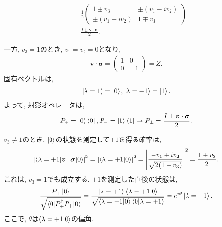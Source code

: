 \begin{ex}
\begin{align*}
         & =
        \frac{1}{2}
        \begin{pmatrix}
            1\pm v_3         & \pm(v_1 - i v_2) \\
            \pm(v_1 - i v_2) & 1\mp v_3
        \end{pmatrix}                    \\
         & =
        \frac{I \pm \bm{v} \cdot \bm{\sigma}}{2}.
    \end{align*}
    \par
    一方, $v_3 = 1$のとき, $v_1 = v_2 = 0$となり,
    \begin{align*}
        \bm{v} \cdot \bm{\sigma}
        =
        \begin{pmatrix}
            1 & 0   \\
            0 & - 1
        \end{pmatrix}
        =
        Z.
    \end{align*}
    固有ベクトルは,
    \begin{align*}
        \ket{\lambda = 1} = \ket{0},
        \ket{\lambda= -1} = \ket{1}.
    \end{align*}
    よって, 射影オペレータは,
    \begin{align*}
        P_{+} = \ket{0}\bra{0},
        P_{-} = \ket{1}\bra{1}
        \to
        P_{\pm} = \frac{I \pm \bm{v} \cdot \bm{\sigma}}{2}.
    \end{align*}
\end{ex}

\begin{ex}
    \label{ex2.61}
    $v_3\neq 1$のとき,
    $\ket{0}$の状態を測定して$+1$を得る確率は,
    \begin{align*}
        \left|
        \braket{\lambda = +1 | \bm{v} \cdot \bm{\sigma} | 0}
        \right|^2
        =
        \left|
        \braket{\lambda = +1 | 0}
        \right|^2
        =
        \left|
        \frac{-v_1 + iv_2}{\sqrt{2(1-v_3)}}
        \right|^2
        =
        \frac{1+v_3}{2}.
    \end{align*}
    これは, $v_3 = 1$でも成立する.
    $+1$を測定した直後の状態は,
    \begin{align*}
        \frac{P_+ \ket{0}}{\sqrt{\braket{0 | P_+^\dagger P_+ | 0}}}
        =
        \frac{\ket{\lambda = +1}\braket{\lambda = +1|0}}{\sqrt{\braket{\lambda = +1 | 0}\braket{0 | \lambda = +1}}}
        =
        e^{i\theta} \ket{\lambda=+1}.
    \end{align*}
    ここで, $\theta$は$\braket{\lambda = +1 | 0}$の偏角.
\end{ex}


